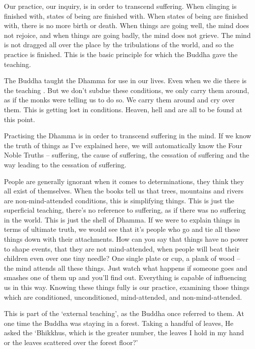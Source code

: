 Our practice, our inquiry, is in order to transcend suffering. When clinging is finished with, states of being are finished with. When states of being are finished with, there is no more birth or death. When things are going well, the mind does not rejoice, and when things are going badly, the mind does not grieve. The mind is not dragged all over the place by the tribulations of the world, and so the practice is finished. This is the basic principle for which the Buddha gave the teaching. 

The Buddha taught the Dhamma for use in our lives. Even when we die there is the teaching . But we don't subdue these conditions, we only carry them around, as if the monks were telling us to do so. We carry them around and cry over them. This is getting lost in conditions. Heaven, hell and  are all to be found at this point. 

Practising the Dhamma is in order to transcend suffering in the mind. If we know the truth of things as I've explained here, we will automatically know the Four Noble Truths -- suffering, the cause of suffering, the cessation of suffering and the way leading to the cessation of suffering. 

People are generally ignorant when it comes to determinations, they think they all exist of themselves. When the books tell us that trees, mountains and rivers are non-mind-attended conditions, this is simplifying things. This is just the superficial teaching, there's no reference to suffering, as if there was no suffering in the world. This is just the shell of Dhamma. If we were to explain things in terms of ultimate truth, we would see that it's people who go and tie all these things down with their attachments. How can you say that things have no power to shape events, that they are not mind-attended, when people will beat their children even over one tiny needle? One single plate or cup, a plank of wood -- the mind attends all these things. Just watch what happens if someone goes and smashes one of them up and you'll find out. Everything is capable of influencing us in this way. Knowing these things fully is our practice, examining those things which are conditioned, unconditioned, mind-attended, and non-mind-attended. 

This is part of the `external teaching', as the Buddha once referred to them. At one time the Buddha was staying in a forest. Taking a handful of leaves, He asked the  `Bhikkhus, which is the greater number, the leaves I hold in my hand or the leaves scattered over the forest floor?' 

